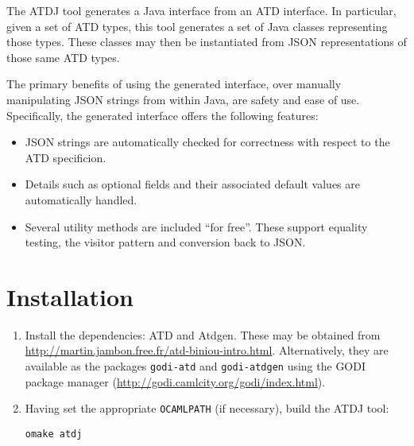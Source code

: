 
The ATDJ tool generates a Java interface from an ATD interface.  In particular,
given a set of ATD types, this tool generates a set of Java classes
representing those types.  These classes may then be instantiated from
JSON representations of those same ATD types.

The primary benefits of using the generated interface, over manually
manipulating JSON strings from within Java, are safety and ease of use.
Specifically, the generated interface offers the following features:

\begin{itemize}
\item JSON strings are automatically checked for correctness with
  respect to the ATD specificion.

\item Details such as optional fields and their associated default values are
  automatically handled.

\item Several utility methods are included ``for free''.
  These support equality testing, the visitor pattern and conversion
  back to JSON.
\end{itemize}


\section{Installation}

\begin{enumerate}
\item Install the dependencies: ATD and Atdgen.  These may be
obtained from \url{http://martin.jambon.free.fr/atd-biniou-intro.html}.
Alternatively, they are available as the packages \verb+godi-atd+
and \verb+godi-atdgen+ using the GODI package manager
(\url{http://godi.camlcity.org/godi/index.html}).

\item Having set the appropriate \verb+OCAMLPATH+ (if necessary),
build the ATDJ tool:

\begin{verbatim}
omake atdj
\end{verbatim}
\end{enumerate}

